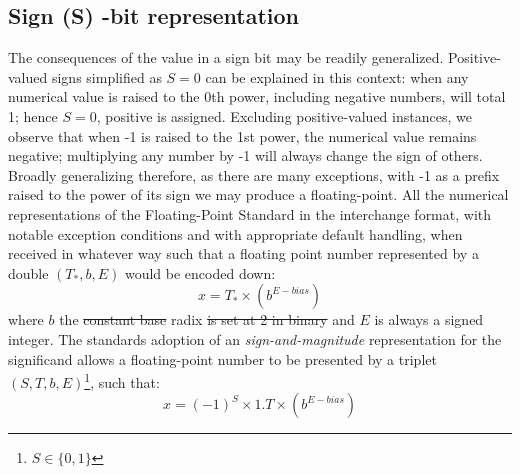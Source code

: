 \documentclass[7pt]{article}
\begin{document}
\subsection*{Sign (S) -bit representation}
The consequences of the value in a sign bit may be readily generalized. Positive-valued signs simplified as $S= 0$ can be explained in this context: when any numerical value is raised to the 0th power, including negative numbers, will total 1; hence $S=0$, positive is assigned. Excluding positive-valued instances, we observe that when -1 is raised to the 1st power, the numerical value remains negative; multiplying any number by -1 will always change the sign of others. Broadly generalizing therefore, as there are many exceptions, with -1 as a prefix raised to the power of its sign we may produce a floating-point. All the numerical representations of the Floating-Point Standard in the interchange format, with notable exception conditions and with appropriate default handling, when received in whatever way such that a floating point number represented by a double $(T_{*}, b, E)$ would be encoded down:
\begin{equation}
x = T_{*} \times (b^{E-bias})
\end{equation}
where $b$ the \st{constant base} radix \st{is set at 2 in binary} and $E$ is always a signed integer. The standards adoption of an \textit{sign-and-magnitude} representation for the significand  allows a floating-point number to be presented by a triplet $(S, T, b, E)$\footnote{$S \in \{0,1\}$ }, such that:
\begin{equation}
x = (-1)^{S}\times 1 . T \times (b^{E-bias})
\label{eq:IEEE754}
\end{equation}
\end{document}
